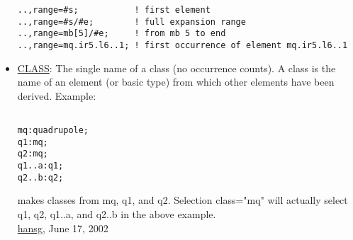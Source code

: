 \begin{itemize}
\begin{verbatim}
..,range=#s;           ! first element
..,range=#s/#e;        ! full expansion range
..,range=mb[5]/#e;     ! from mb 5 to end
..,range=mq.ir5.l6..1; ! first occurrence of element mq.ir5.l6..1
\end{verbatim}
	\item \href{class}{CLASS}: The single name of a class (no occurrence counts). A class is the name of an element (or basic type) from which other elements have been derived. Example: 
\begin{verbatim}

mq:quadrupole;
q1:mq;
q2:mq;
q1..a:q1;
q2..b:q2;
\end{verbatim} makes classes from mq, q1, and q2. Selection class="mq" will actually select q1, q2, q1..a, and q2..b in the above example. 
\\
\href{http://www.cern.ch/Hans.Grote/hansg_sign.html}{hansg}, June 17, 2002 
\end{itemize}

